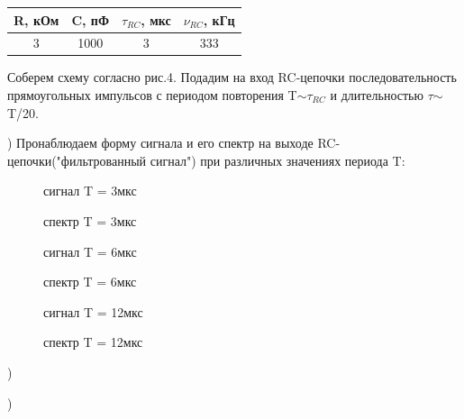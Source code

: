 \documentclass[a4paper,12pt]{article}
\begin{document}
\begin{center}
\begin{tabular}{|c|c|c|c|}
	\hline
	R, кОм & C, пФ & $\tau_{RC}$, мкс & $\nu_{RC}$, кГц \\
	\hline
	3 & 1000 & 3 & 333 \\
	\hline
\end{tabular}
\end{center}

\par Соберем схему согласно рис.4. Подадим на вход RC-цепочки последовательность прямоугольных импульсов с периодом повторения T$\sim$$\tau_{RC}$ и длительностью $\tau$$\sim$T/20. 

) Пронаблюдаем форму сигнала и его спектр на выходе RC-цепочки("фильтрованный сигнал") при различных значениях периода T:

\begin{figure}
\caption{сигнал T = 3мкс}
\end{figure}
\begin{figure}
\caption{спектр T = 3мкс}
\end{figure}
\begin{figure}
\caption{сигнал T = 6мкс}
\end{figure}
\begin{figure}
\caption{спектр T = 6мкс}
\end{figure}
\begin{figure}
\caption{сигнал T = 12мкс}
\end{figure}
\begin{figure}
\caption{спектр T = 12мкс}
\end{figure}

)

)
\end{document}
